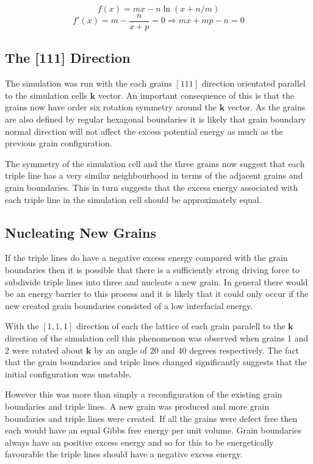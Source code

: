\documentclass[12pt,a4paper]{book}
\begin{document}
\[ f(x) = mx - n\ln(x+n/m)\]
\[ f'(x) = m -\frac{n}{x+p} = 0 \Rightarrow  mx + mp - n = 0 \]


\subsection{The [111] Direction}
The simulation was run with the each grains $[111]$ direction orientated parallel to the simulation cells $\mathbf{k}$ vector. An important consequence of this is that the grains now have order six rotation symmetry around the $\mathbf{k}$ vector. As the grains are also defined by regular hexagonal boundaries it is likely that grain boundary normal direction will not affect the excess potential energy as much as the previous grain configuration.

The symmetry of the simulation cell and the three grains now suggest that each triple line has a very similar neighbourhood in terms of the adjacent grains and grain boundaries. This in turn suggests that the excess energy associated with each triple line in the simulation cell should be approximately equal.

\subsection{Nucleating New Grains}

If the triple lines do have a negative excess energy compared with the grain boundaries then it is possible that there is a sufficiently strong driving force to subdivide triple lines into three and nucleate a new grain. In general there would be an energy barrier to this process and it is likely that it could only occur if the new created grain boundaries consisted of a low interfacial energy.

With the $[1,1,1]$ direction of each the lattice of each grain paralell to the $\mathbf{k}$ direction of the simulation cell this phenomenon was observed when grains 1 and 2 were rotated about $\mathbf{k}$  by an angle of 20 and 40 degrees respectively. The fact that the grain boundaries and triple lines changed significantly suggests that the initial configuration was unstable. 

However this was more than simply a reconfiguration of the existing grain boundaries and triple lines. A new grain was produced and more grain boundaries and triple lines were created. If all the grains were defect free then each would have an equal Gibbs free energy per unit volume. Grain boundaries always have an positive excess energy and so for this to be energetically favourable the triple lines should have a negative excess energy.
\end{document}
